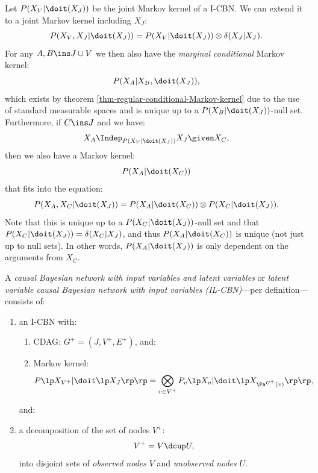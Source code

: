 \begin{Rem}
    Let $P(X_V|\doit(X_J))$ be the joint Markov kernel of a I-CBN.
    We can extend it to a joint Markov kernel including $X_J$:
    \[P(X_V,X_J|\doit(X_J)) = P(X_V|\doit(X_J)) \otimes \delta(X_J|X_J).  \]
    For any $A, B \ins J \cup V$ we then also have the \emph{marginal conditional} Markov kernel:
    \[P(X_A|X_B,\doit(X_J)),\]
    which exists by theorem \ref{thm-regular-conditional-Markov-kernel} due to the use of standard measurable spaces
    and is unique up to a $P(X_B|\doit(X_J))$-null set.\\
    Furthermore, if $C \ins J$ and we have: 
    \[X_A \Indep_{P(X_V|\doit(X_J))} X_J \given X_C,\]
    then we also have a Markov kernel:
    \[ P(X_A|\doit(X_C)) \]
    that fits into the equation:
    \[ P(X_A,X_C|\doit(X_J)) = P(X_A|\doit(X_C)) \otimes P(X_C|\doit(X_J)). \]
    Note that this is unique up to a $P(X_C|\doit(X_J))$-null set and that $P(X_C|\doit(X_J)) = \delta(X_C|X_J)$, 
    and thus $P(X_A|\doit(X_C))$ is unique (not just up to null sets).
    In other words, $P(X_A|\doit(X_J))$ is only dependent on the arguments from $X_C$. 
\end{Rem}

\begin{Def}\label{def:il-cbn}
    A \emph{causal Bayesian network with input variables and latent variables} or
    \emph{latent variable causal Bayesian network with input variables (IL-CBN)}---per 
    definition---consists of:
    \begin{enumerate}[label=\alph*)]
            \item an I-CBN with:
              \begin{enumerate}[label=\roman*)]
                    \item CDAG: $G^+=(J,V^+,E^+)$, and:
                    \item Markov kernel: 
                        \[ P\lp X_{V^+}| \doit\lp X_J \rp\rp 
                        = \bigotimes_{v \in V^+} P_v\lp X_v|\doit\lp X_{\Pa^{G^+}(v)}\rp\rp,\]                      
                \end{enumerate}
                    and: 
                \item a decomposition of the set of nodes $V^+$:
                    \[ V^+ = V \dcup U, \]
                     into disjoint sets of \emph{observed nodes} $V$ 
                     and \emph{unobserved nodes} $U$.
    \end{enumerate}
\end{Def}

